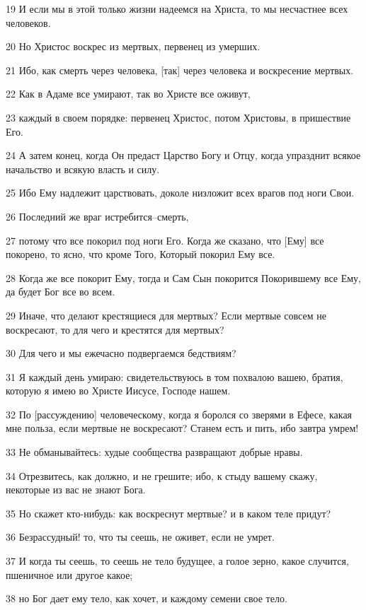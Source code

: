 \par 19 И если мы в этой только жизни надеемся на Христа, то мы несчастнее всех человеков.
\par 20 Но Христос воскрес из мертвых, первенец из умерших.
\par 21 Ибо, как смерть через человека, [так] через человека и воскресение мертвых.
\par 22 Как в Адаме все умирают, так во Христе все оживут,
\par 23 каждый в своем порядке: первенец Христос, потом Христовы, в пришествие Его.
\par 24 А затем конец, когда Он предаст Царство Богу и Отцу, когда упразднит всякое начальство и всякую власть и силу.
\par 25 Ибо Ему надлежит царствовать, доколе низложит всех врагов под ноги Свои.
\par 26 Последний же враг истребится--смерть,
\par 27 потому что все покорил под ноги Его. Когда же сказано, что [Ему] все покорено, то ясно, что кроме Того, Который покорил Ему все.
\par 28 Когда же все покорит Ему, тогда и Сам Сын покорится Покорившему все Ему, да будет Бог все во всем.
\par 29 Иначе, что делают крестящиеся для мертвых? Если мертвые совсем не воскресают, то для чего и крестятся для мертвых?
\par 30 Для чего и мы ежечасно подвергаемся бедствиям?
\par 31 Я каждый день умираю: свидетельствуюсь в том похвалою вашею, братия, которую я имею во Христе Иисусе, Господе нашем.
\par 32 По [рассуждению] человеческому, когда я боролся со зверями в Ефесе, какая мне польза, если мертвые не воскресают? Станем есть и пить, ибо завтра умрем!
\par 33 Не обманывайтесь: худые сообщества развращают добрые нравы.
\par 34 Отрезвитесь, как должно, и не грешите; ибо, к стыду вашему скажу, некоторые из вас не знают Бога.
\par 35 Но скажет кто-нибудь: как воскреснут мертвые? и в каком теле придут?
\par 36 Безрассудный! то, что ты сеешь, не оживет, если не умрет.
\par 37 И когда ты сеешь, то сеешь не тело будущее, а голое зерно, какое случится, пшеничное или другое какое;
\par 38 но Бог дает ему тело, как хочет, и каждому семени свое тело.
